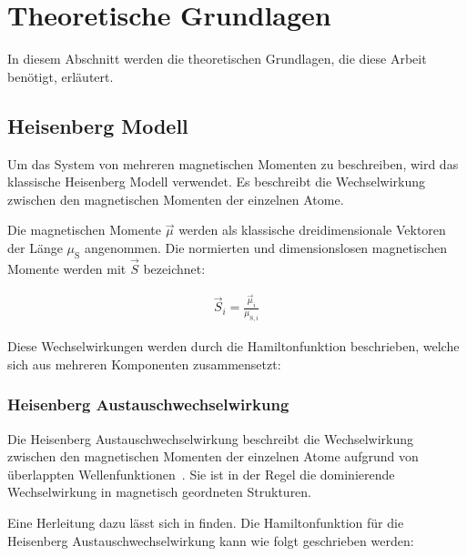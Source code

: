 \documentclass[main.tex]{subfiles}
\begin{document}
\newpage
\section{Theoretische Grundlagen}

In diesem Abschnitt werden die theoretischen Grundlagen, die diese Arbeit benötigt, erläutert.

\subsection{Heisenberg Modell}

Um das System von mehreren magnetischen Momenten zu beschreiben, wird das klassische Heisenberg Modell verwendet. Es beschreibt die Wechselwirkung zwischen den magnetischen Momenten der einzelnen Atome.

Die magnetischen Momente \(\vec{\mu}\) werden als klassische dreidimensionale Vektoren der Länge \(\mu_{\text{S}}\) angenommen.
Die normierten und dimensionslosen magnetischen Momente werden mit \(\vec{S}\) bezeichnet:

\begin{align}
	\vec{S}_i = \frac{\vec{\mu}_i}{\mu_{\text{S},i}}
\end{align}


Diese Wechselwirkungen werden durch die Hamiltonfunktion beschrieben, welche sich aus mehreren Komponenten zusammensetzt:

\subsubsection*{Heisenberg Austauschwechselwirkung}

Die Heisenberg Austauschwechselwirkung beschreibt die Wechselwirkung zwischen den magnetischen Momenten der einzelnen Atome aufgrund von überlappten Wellenfunktionen~\cite{Heisenberg-Ferromagnetismus}. 
Sie ist in der Regel die dominierende Wechselwirkung in magnetisch geordneten Strukturen.

Eine Herleitung dazu lässt sich in \cite{magnetism-in-condensed-matter} finden.
Die Hamiltonfunktion für die Heisenberg Austauschwechselwirkung kann wie folgt geschrieben werden:
\end{document}
